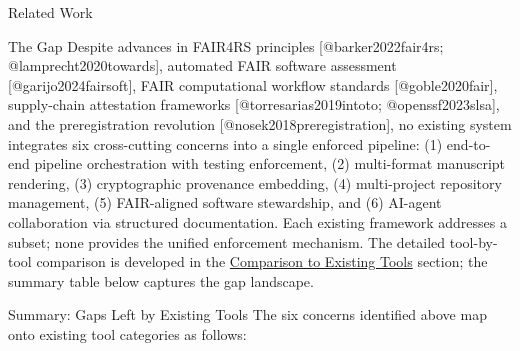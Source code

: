 \documentclass[
  ignorenonframetext,
]{beamer}
\newcounter{none} %
\begin{document}
\begin{frame}[fragile]{Related Work}
\begin{block}{The Gap}
\protect{}\label{the-gap}
Despite advances in FAIR4RS principles {[}@barker2022fair4rs;
@lamprecht2020towards{]}, automated FAIR software assessment
{[}@garijo2024fairsoft{]}, FAIR computational workflow standards
{[}@goble2020fair{]}, supply-chain attestation frameworks
{[}@torresarias2019intoto; @openssf2023slsa{]}, and the preregistration
revolution {[}@nosek2018preregistration{]}, no existing system
integrates six cross-cutting concerns into a single enforced pipeline:
(1) end-to-end pipeline orchestration with testing enforcement, (2)
multi-format manuscript rendering, (3) cryptographic provenance
embedding, (4) multi-project repository management, (5) FAIR-aligned
software stewardship, and (6) AI-agent collaboration via structured
documentation. Each existing framework addresses a subset; none provides
the unified enforcement mechanism. The detailed tool-by-tool comparison
is developed in the
\href{05c_comparison.md\#comparison-to-existing-tools}{Comparison to
Existing Tools} section; the summary table below captures the gap
landscape.
\end{block}

\begin{block}{Summary: Gaps Left by Existing Tools}
\protect{}\label{summary-gaps-left-by-existing-tools}
The six concerns identified above map onto existing tool categories as
follows:


\end{block}
\end{frame}
\end{document}
